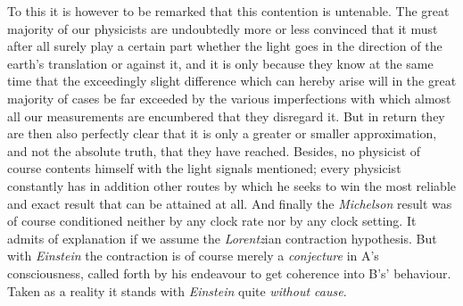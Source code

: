 \documentclass[12pt,a4paper]{article}
\begin{document}
To this it is however to be remarked that this contention is untenable. The
great majority of our physicists are undoubtedly more or less convinced that
it must after all surely play a certain part whether the light goes in the
direction of the earth's translation or against it, and it is only because
they know at the same time that the exceedingly slight difference which can
hereby arise will in the great majority of cases be far exceeded by the
various imperfections with which almost all our measurements are encumbered
that they disregard it. But in return they are then also perfectly clear that
it is only a greater or smaller approximation, and not the absolute truth,
that they have reached. Besides, no physicist of course contents himself with
the light signals mentioned; every physicist constantly has in addition other
routes by which he seeks to win the most reliable and exact result that can be
attained at all. And finally the \emph{Michelson} result was of course
conditioned neither by any clock rate nor by any clock setting. It admits of
explanation if we assume the \emph{Lorentz}ian contraction hypothesis. But
with \emph{Einstein} the contraction is of course merely a \emph{conjecture}
in A's consciousness, called forth by his endeavour to get coherence into B's'
behaviour. Taken as a reality it stands with \emph{Einstein} quite
\emph{without cause}.
\end{document}
